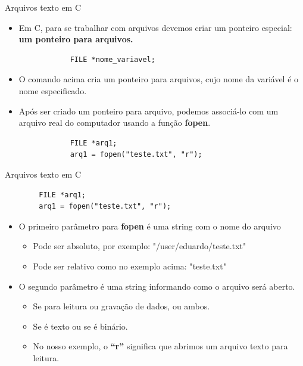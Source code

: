 \documentclass[handout]{beamer}
\begin{document}
\begin{frame}[fragile]{Arquivos texto em C}

    \begin{itemize}
        \item Em C, para se trabalhar com arquivos devemos criar um ponteiro especial: \textbf{um ponteiro para arquivos.}
        \begin{verbatim}
            FILE *nome_variavel;
        \end{verbatim}
        \item O comando acima cria um ponteiro para arquivos, cujo nome da variável é o nome especificado.
    \end{itemize}
    \begin{itemize}
        \item Após ser criado um ponteiro para arquivo, podemos associá-lo com um arquivo real do computador
        usando a função \textbf{fopen}.
        \begin{verbatim}
            FILE *arq1;
            arq1 = fopen("teste.txt", "r");
        \end{verbatim}
    \end{itemize}

\end{frame}

\begin{frame}[fragile]{Arquivos texto em C}

    \begin{verbatim}
        FILE *arq1;
        arq1 = fopen("teste.txt", "r");
    \end{verbatim}
    \begin{itemize}
        \item O primeiro parâmetro para \textbf{fopen} é uma string com o nome do arquivo
        \begin{itemize}
            \item Pode ser absoluto, por exemplo: "/user/eduardo/teste.txt"
            \item Pode ser relativo como no exemplo acima: "teste.txt"
        \end{itemize}
        \item O segundo parâmetro é uma string informando como o arquivo será aberto.
        \begin{itemize}
            \item Se para leitura ou gravação de dados, ou ambos.
            \item Se é texto ou se é binário.
            \item No nosso exemplo, o \textbf{``r''} significa que abrimos um arquivo texto para leitura.
        \end{itemize}
    \end{itemize}
\end{frame}
\end{document}
